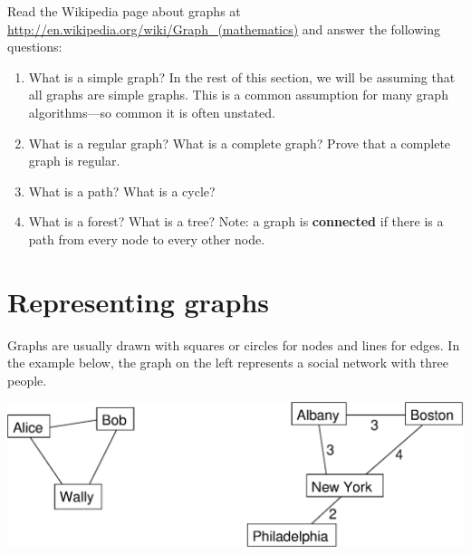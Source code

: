 \documentclass[10pt]{book}
\begin{document}
\begin{ex}

Read the Wikipedia page about graphs at
\url{http://en.wikipedia.org/wiki/Graph_(mathematics)}
and answer the following questions:

\begin{enumerate}

\item What is a simple graph?  In the rest of this section,
we will be assuming that all graphs are simple graphs.  This
is a common assumption for many graph algorithms---so
common it is often unstated.

\item What is a regular graph?  What is a complete graph?  Prove
that a complete graph is regular.

\item What is a path?  What is a cycle?

\item What is a forest?  What is a tree?  Note: a graph
is {\bf connected} if there is a path from every node to
every other node.

\end{enumerate}

\end{ex}



\section{Representing graphs}

Graphs are usually drawn with squares or circles for nodes and lines
for edges.  In the example below, the graph on the left represents
a social network with three people.


\beforefig
\centerline{\includegraphics[width=5.5in]{figs/graph_examples.eps}}
\afterfig
\end{document}

